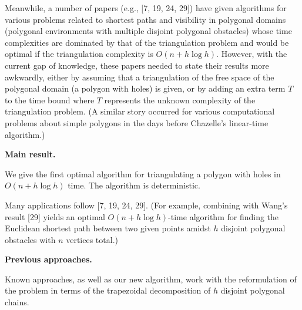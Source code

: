 \documentclass[10pt,a4paper]{article}
\begin{document}
\par
\par
Meanwhile, a number of papers (e.g., [7, 19, 24, 29]) have given algorithms for various problems related to shortest paths and visibility in polygonal domains (polygonal environments with multiple disjoint polygonal obstacles) whose time complexities are dominated by that of the triangulation problem and would be optimal if the triangulation complexity is $O(n+h\log h)$. However, with the current gap of knowledge, these papers needed to state their results more awkwardly, either by assuming that a triangulation of the free space of the polygonal domain (a polygon with holes) is given, or by adding an extra term $T$ to the time bound where $T$ represents the unknown complexity of the triangulation problem. (A similar story occurred for various computational problems about simple polygons in the days before Chazelle’s linear-time algorithm.)
\par
\par
\par\medskip\noindent\textbf{Main result.}\par
We give the first optimal algorithm for triangulating a polygon with holes in $O(n+h\log h)$ time. The algorithm is deterministic.
\par
\par
Many applications follow [7, 19, 24, 29]. (For example, combining with Wang’s result [29] yields an optimal $O(n+h\log h)$-time algorithm for finding the Euclidean shortest path between two given points amidst $h$ disjoint polygonal obstacles with $n$ vertices total.)
\par
\par
\par\medskip\noindent\textbf{Previous approaches.}\par
Known approaches, as well as our new algorithm, work with the reformulation of the problem in terms of the trapezoidal decomposition of $h$ disjoint polygonal chains.
\par
\par
\end{document}
